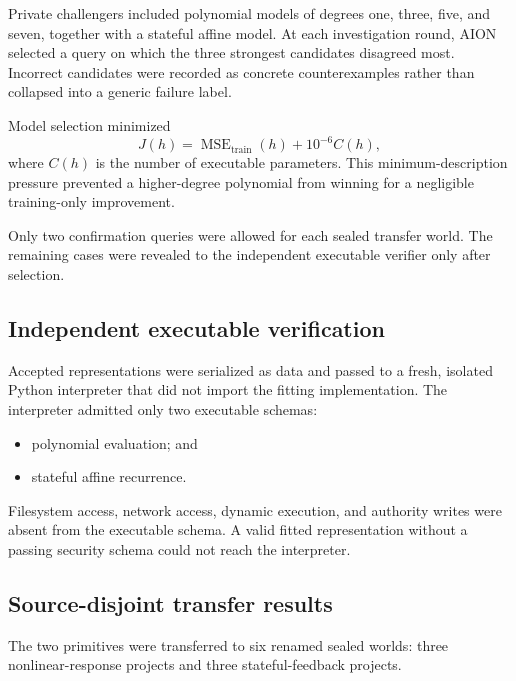 Private challengers included polynomial models of degrees one, three, five,
and seven, together with a stateful affine model.  At each investigation round,
AION selected a query on which the three strongest candidates disagreed most.
Incorrect candidates were recorded as concrete counterexamples rather than
collapsed into a generic failure label.

Model selection minimized
\begin{equation}
J(h)=\operatorname{MSE}_{\mathrm{train}}(h)
     +10^{-6}C(h),
\label{eq:arena-v5-mdl}
\end{equation}
where $C(h)$ is the number of executable parameters.  This minimum-description
pressure prevented a higher-degree polynomial from winning for a negligible
training-only improvement.

Only two confirmation queries were allowed for each sealed transfer world.
The remaining cases were revealed to the independent executable verifier only
after selection.


\subsection{Independent executable verification}
\label{subsec:arena-v5-execution}

Accepted representations were serialized as data and passed to a fresh,
isolated Python interpreter that did not import the fitting implementation.
The interpreter admitted only two executable schemas:
\begin{itemize}
  \item polynomial evaluation; and
  \item stateful affine recurrence.
\end{itemize}

Filesystem access, network access, dynamic execution, and authority writes were
absent from the executable schema.  A valid fitted representation without a
passing security schema could not reach the interpreter.


\subsection{Source-disjoint transfer results}
\label{subsec:arena-v5-results}

The two primitives were transferred to six renamed sealed worlds: three
nonlinear-response projects and three stateful-feedback projects.

